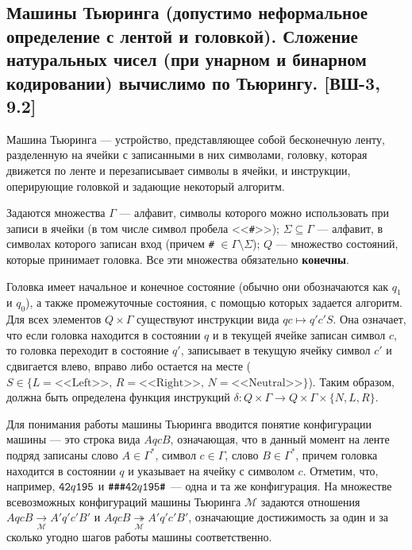 \documentclass[a4paper, fleqn]{article}
\newcommand{\wo}{\setminus} %
\begin{document}
    \subsection{Машины Тьюринга (допустимо неформальное определение с лентой и головкой). Сложение натуральных чисел (при унарном и бинарном кодировании) вычислимо по Тьюрингу. [ВШ-3, 9.2]}

        Машина Тьюринга --- устройство, представляющее собой бесконечную ленту, разделенную на ячейки с записанными в них символами, головку, которая движется по ленте и перезаписывает символы в ячейки, и инструкции, оперирующие головкой и задающие некоторый алгоритм.

        Задаются множества $\Gamma$ --- алфавит, символы которого можно использовать при записи в ячейки (в том числе символ пробела <<\verb'#'>>); $\Sigma \subseteq \Gamma$ --- алфавит, в символах которого записан вход (причем \verb'#' $\in \Gamma \wo \Sigma$); $Q$ --- множество состояний, которые принимает головка. Все эти множества обязательно \textbf{конечны}.

        Головка имеет начальное и конечное состояние (обычно они обозначаются как $q_1$ и $q_0$), а также промежуточные состояния, с помощью которых задается алгоритм. Для всех элементов $Q \times \Gamma$ существуют инструкции вида $q c \mapsto q' c' S$. Она означает, что если головка находится в состоянии $q$ и в текущей ячейке записан символ $c$, то головка переходит в состояние $q'$, записывает в текущую ячейку символ $c'$ и сдвигается влево, вправо либо остается на месте ($S \in \{L = \text{<<Left>>}, \, R = \text{<<Right>>}, \, N = \text{<<Neutral>>}\}$). Таким образом, должна быть определена функция инструкций $\delta : Q \times \Gamma \to Q \times \Gamma \times \{N, L, R\}$.

        Для понимания работы машины Тьюринга вводится понятие конфигурации машины --- это строка вида $AqcB$, означающая, что в данный момент на ленте подряд записаны слово $A \in \Gamma^*$, символ $c \in \Gamma$, слово $B \in \Gamma^*$, причем головка находится в состоянии $q$ и указывает на ячейку с символом $c$. Отметим, что, например, $\verb'42'q\verb'195'$ и $\verb'###42'q\verb'195#'$ --- одна и та же конфигурация. На множестве всевозможных конфигураций машины Тьюринга $\mathcal{M}$ задаются отношения $AqcB \underset{\mathcal{M}}{\to} A'q'c'B'$ и $AqcB \underset{\mathcal{M}}{\twoheadrightarrow} A'q'c'B'$, означающие достижимость за один и за сколько угодно шагов работы машины соответственно.
\end{document}
